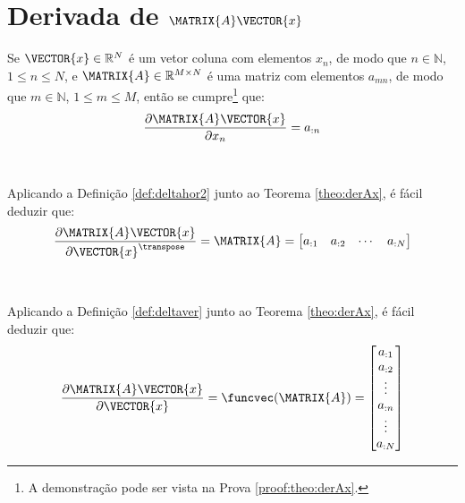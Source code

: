 
\section{Derivada de $\MATRIX{A}\VECTOR{x}$}

\begin{theorem}\label{theo:derAx}
Se 
$\VECTOR{x}\in \mathbb{R}^N$ é um vetor coluna com elementos $x_n$,
de modo que $n\in \mathbb{N}$, $1 \leq n \leq N$, e 
$\MATRIX{A} \in \mathbb{R}^{M\times N}$ é uma matriz com elementos $a_{mn}$,
de modo que $m\in \mathbb{N}$, $1 \leq m \leq M$, 
então se cumpre\footnote{A demonstração pode ser vista na Prova \ref{proof:theo:derAx}.} que:
\begin{equation}
\frac{\partial \MATRIX{A}\VECTOR{x}}{\partial x_n}=a_{:n}
\end{equation}
\end{theorem}
~

\begin{corollary}\label{coro:derAx1}
Aplicando a Definição \ref{def:deltahor2} junto ao Teorema \ref{theo:derAx}, é
fácil deduzir que:
\begin{equation}
\frac{\partial \MATRIX{A}\VECTOR{x}}{\partial \VECTOR{x}^{\transpose}}=
\MATRIX{A}=
\left[
\begin{matrix}
 a_{:1} &  a_{:2} &  \cdots &  a_{:N}
\end{matrix}
\right]
\end{equation}
\end{corollary}
~

\begin{corollary}\label{coro:derAx2}
Aplicando a Definição \ref{def:deltaver} junto ao Teorema \ref{theo:derAx}, é
fácil deduzir que:
\begin{equation}
\frac{\partial \MATRIX{A}\VECTOR{x}}{\partial \VECTOR{x}}=\funcvec(\MATRIX{A})=
\left[
\begin{matrix}
 a_{:1} \\  
a_{:2} \\  
\vdots \\  
a_{:n} \\  
\vdots \\  
a_{:N}
\end{matrix}
\right]
\end{equation}
\end{corollary}

